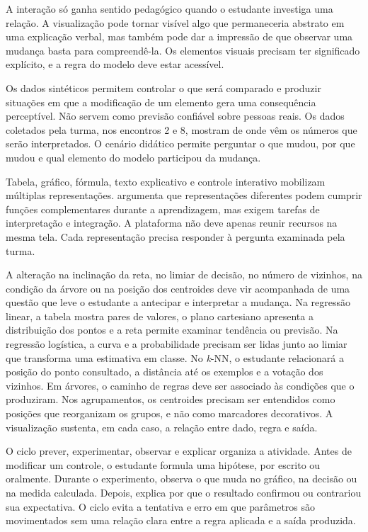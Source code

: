 A interação só ganha sentido pedagógico quando o estudante investiga uma relação. A visualização pode tornar visível algo que permaneceria abstrato em uma explicação verbal, mas também pode dar a impressão de que observar uma mudança basta para compreendê-la. Os elementos visuais precisam ter significado explícito, e a regra do modelo deve estar acessível.

Os dados sintéticos permitem controlar o que será comparado e produzir situações em que a modificação de um elemento gera uma consequência perceptível. Não servem como previsão confiável sobre pessoas reais. Os dados coletados pela turma, nos encontros 2 e 8, mostram de onde vêm os números que serão interpretados. O cenário didático permite perguntar o que mudou, por que mudou e qual elemento do modelo participou da mudança.

Tabela, gráfico, fórmula, texto explicativo e controle interativo mobilizam múltiplas representações.  argumenta que representações diferentes podem cumprir funções complementares durante a aprendizagem, mas exigem tarefas de interpretação e integração. A plataforma não deve apenas reunir recursos na mesma tela. Cada representação precisa responder à pergunta examinada pela turma.

A alteração na inclinação da reta, no limiar de decisão, no número de vizinhos, na condição da árvore ou na posição dos centroides deve vir acompanhada de uma questão que leve o estudante a antecipar e interpretar a mudança. Na regressão linear, a tabela mostra pares de valores, o plano cartesiano apresenta a distribuição dos pontos e a reta permite examinar tendência ou previsão. Na regressão logística, a curva e a probabilidade precisam ser lidas junto ao limiar que transforma uma estimativa em classe. No \textit{k}-NN, o estudante relacionará a posição do ponto consultado, a distância até os exemplos e a votação dos vizinhos. Em árvores, o caminho de regras deve ser associado às condições que o produziram. Nos agrupamentos, os centroides precisam ser entendidos como posições que reorganizam os grupos, e não como marcadores decorativos. A visualização sustenta, em cada caso, a relação entre dado, regra e saída.

O ciclo prever, experimentar, observar e explicar organiza a atividade. Antes de modificar um controle, o estudante formula uma hipótese, por escrito ou oralmente. Durante o experimento, observa o que muda no gráfico, na decisão ou na medida calculada. Depois, explica por que o resultado confirmou ou contrariou sua expectativa. O ciclo evita a tentativa e erro em que parâmetros são movimentados sem uma relação clara entre a regra aplicada e a saída produzida.

